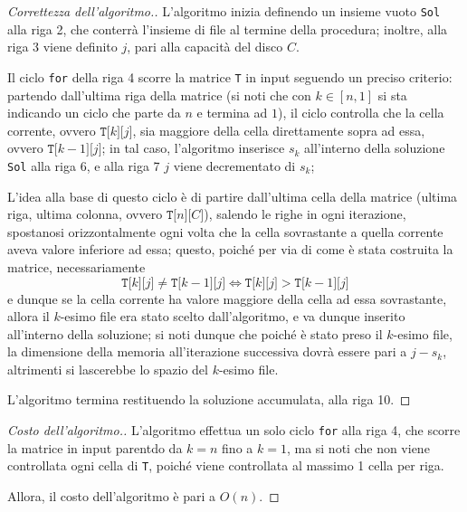 \documentclass[a4paper, 12pt]{report}
\begin{document}
    \begin{proof}[Correttezza dell'algoritmo.]
        L'algoritmo inizia definendo un insieme vuoto \texttt{Sol} alla riga 2, che conterrà l'insieme di file al termine della procedura; inoltre, alla riga 3 viene definito $j$, pari alla capacità del disco $C$.

        Il ciclo \texttt{for} della riga 4 scorre la matrice \texttt{T} in input seguendo un preciso criterio: partendo dall'ultima riga della matrice (si noti che con $k \in [n, 1]$ si sta indicando un ciclo che parte da $n$ e termina ad $1$), il ciclo controlla che la cella corrente, ovvero $\texttt{T[}k\texttt{][}j\texttt{]}$, sia maggiore della cella direttamente sopra ad essa, ovvero $\texttt{T[}k - 1\texttt{][}j\texttt{]}$; in tal caso, l'algoritmo inserisce $s_k$ all'interno della soluzione \texttt{Sol} alla riga 6, e alla riga 7 $j$ viene decrementato di $s_k$;

        L'idea alla base di questo ciclo è di partire dall'ultima cella della matrice (ultima riga, ultima colonna, ovvero $\texttt{T[}n\texttt{][}C\texttt{]}$), salendo le righe in ogni iterazione, spostanosi orizzontalmente ogni volta che la cella sovrastante a quella corrente aveva valore inferiore ad essa; questo, poiché per via di come è stata costruita la matrice, necessariamente $$\texttt{T[}k\texttt{][}j\texttt{]} \neq \texttt{T[}k -1\texttt{][}j\texttt{]} \iff \texttt{T[}k\texttt{][}j\texttt{]} > \texttt{T[}k -1\texttt{][}j\texttt{]}$$ e dunque se la cella corrente ha valore maggiore della cella ad essa sovrastante, allora il $k$-esimo file era stato scelto dall'algoritmo, e va dunque inserito all'interno della soluzione; si noti dunque che poiché è stato preso il $k$-esimo file, la dimensione della memoria all'iterazione successiva dovrà essere pari a $j - s_k$, altrimenti si lascerebbe lo spazio del $k$-esimo file.

        L'algoritmo termina restituendo la soluzione accumulata, alla riga 10.
    \end{proof}

    \begin{proof}[Costo dell'algoritmo.]
        L'algoritmo effettua un solo ciclo \texttt{for} alla riga 4, che scorre la matrice in input parentdo da $k = n$ fino a $k = 1$, ma si noti che non viene controllata ogni cella di \texttt{T}, poiché viene controllata al massimo 1 cella per riga.

        Allora, il costo dell'algoritmo è pari a $O(n)$.
    \end{proof}
\end{document}
